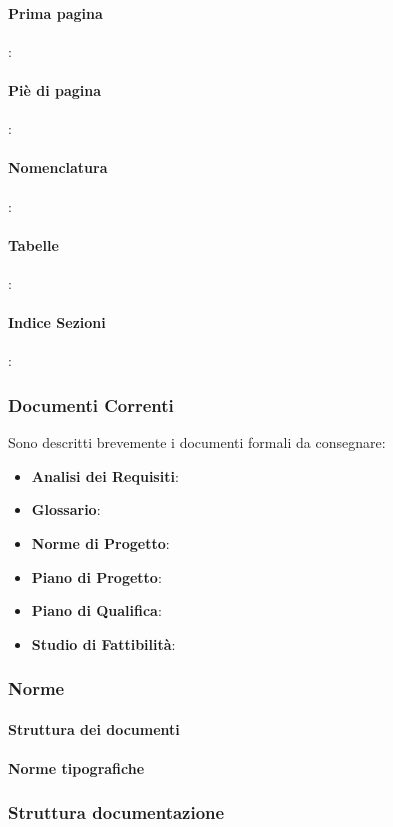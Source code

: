 \paragraph{Prima pagina}:
\paragraph{Piè di pagina}:
\paragraph{Nomenclatura}:
\paragraph{Tabelle}:
\paragraph{Indice Sezioni}:


\subsubsection{Documenti Correnti}
Sono descritti brevemente i documenti formali da consegnare:
\begin{itemize}
	\item \textbf{Analisi dei Requisiti}:
	\item \textbf{Glossario}:
	\item \textbf{Norme di Progetto}:
	\item \textbf{Piano di Progetto}:
	\item \textbf{Piano di Qualifica}:
	\item \textbf{Studio di Fattibilità}:
\end{itemize}


\subsubsection{Norme}

\paragraph{Struttura dei documenti}
\paragraph{Norme tipografiche}

\subsubsection{Struttura documentazione}

